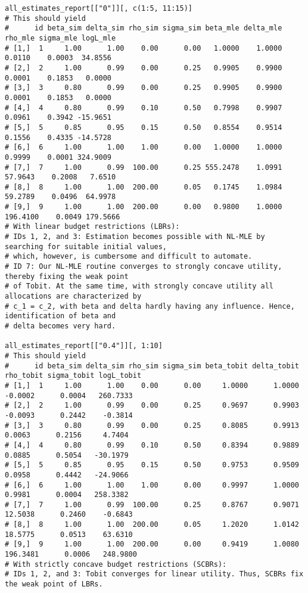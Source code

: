 \documentclass[12pt, a4paper, oneside]{article}
\theoremstyle{Plain}
\theoremstyle{Definition}
\theoremstyle{Remark}
\begin{document}
\begin{appendix}
\begin{lstlisting}
all_estimates_report[["0"]][, c(1:5, 11:15)]
# This should yield
#      id beta_sim delta_sim rho_sim sigma_sim beta_mle delta_mle  rho_mle sigma_mle logL_mle
# [1,]  1     1.00      1.00    0.00      0.00   1.0000    1.0000   0.0110    0.0003  34.8556
# [2,]  2     1.00      0.99    0.00      0.25   0.9905    0.9900   0.0001    0.1853   0.0000
# [3,]  3     0.80      0.99    0.00      0.25   0.9905    0.9900   0.0001    0.1853   0.0000
# [4,]  4     0.80      0.99    0.10      0.50   0.7998    0.9907   0.0961    0.3942 -15.9651
# [5,]  5     0.85      0.95    0.15      0.50   0.8554    0.9514   0.1556    0.4335 -14.5728
# [6,]  6     1.00      1.00    1.00      0.00   1.0000    1.0000   0.9999    0.0001 324.9009
# [7,]  7     1.00      0.99  100.00      0.25 555.2478    1.0991  57.9643    0.2008   7.6510
# [8,]  8     1.00      1.00  200.00      0.05   0.1745    1.0984  59.2789    0.0496  64.9978
# [9,]  9     1.00      1.00  200.00      0.00   0.9800    1.0000 196.4100    0.0049 179.5666
# With linear budget restrictions (LBRs):
# IDs 1, 2, and 3: Estimation becomes possible with NL-MLE by searching for suitable initial values,
# which, however, is cumbersome and difficult to automate.
# ID 7: Our NL-MLE routine converges to strongly concave utility, thereby fixing the weak point
# of Tobit. At the same time, with strongly concave utility all allocations are characterized by
# c_1 = c_2, with beta and delta hardly having any influence. Hence, identification of beta and
# delta becomes very hard.

all_estimates_report[["0.4"]][, 1:10]
# This should yield
#      id beta_sim delta_sim rho_sim sigma_sim beta_tobit delta_tobit rho_tobit sigma_tobit logL_tobit
# [1,]  1     1.00      1.00    0.00      0.00     1.0000      1.0000   -0.0002      0.0004   260.7333
# [2,]  2     1.00      0.99    0.00      0.25     0.9697      0.9903   -0.0093      0.2442    -0.3814
# [3,]  3     0.80      0.99    0.00      0.25     0.8085      0.9913    0.0063      0.2156     4.7404
# [4,]  4     0.80      0.99    0.10      0.50     0.8394      0.9889    0.0885      0.5054   -30.1979
# [5,]  5     0.85      0.95    0.15      0.50     0.9753      0.9509    0.0958      0.4442   -24.9066
# [6,]  6     1.00      1.00    1.00      0.00     0.9997      1.0000    0.9981      0.0004   258.3382
# [7,]  7     1.00      0.99  100.00      0.25     0.8767      0.9071   12.5038      0.2460    -0.6843
# [8,]  8     1.00      1.00  200.00      0.05     1.2020      1.0142   18.5775      0.0513    63.6310
# [9,]  9     1.00      1.00  200.00      0.00     0.9419      1.0080  196.3481      0.0006   248.9800
# With strictly concave budget restrictions (SCBRs):
# IDs 1, 2, and 3: Tobit converges for linear utility. Thus, SCBRs fix the weak point of LBRs.


\end{lstlisting}
\end{appendix}
\end{document}

